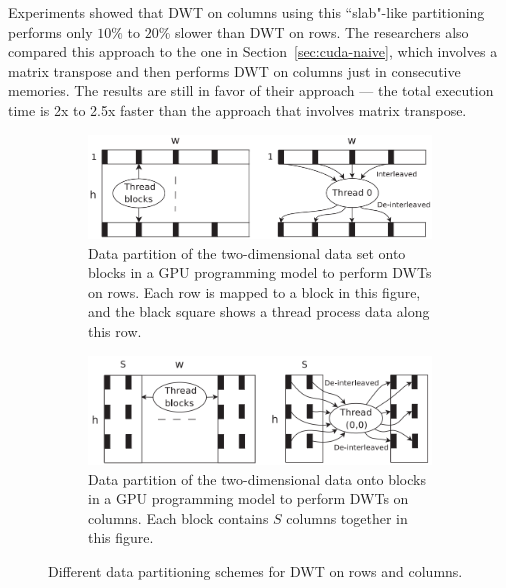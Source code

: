 Experiments showed that DWT on columns using this ``slab"-like 
partitioning performs only $10\%$ to $20\%$ slower than DWT on rows.
%
The researchers also compared this approach to the one in 
Section~\ref{sec:cuda-naive}, which involves a matrix transpose
and then performs DWT on columns just in consecutive memories.
%
The results are still in favor of their approach --- the total
execution time is 2x to 2.5x faster than the approach that involves
matrix transpose.

\begin{figure}
    \centering
    \begin{subfigure}[b]{0.85\textwidth}
                \includegraphics[width=\textwidth]{fig/row.png}
                \caption{
                Data partition of the two-dimensional data set onto 
                blocks in a GPU programming model to perform DWTs on rows.
                Each row is mapped to a block in this figure, and the black
                square shows a thread process data along this row. 
                }
                \label{fig:cuda-row}
        \end{subfigure}
\quad
    \begin{subfigure}[b]{0.85\textwidth}
        \includegraphics[width=\textwidth]{fig/column.png}
        \caption{
                Data partition of the two-dimensional data onto 
                blocks in a GPU programming model to perform DWTs on columns.
                Each block contains $S$ columns together in this figure.
                }
        \label{fig:cuda-column}
    \end{subfigure}
%
    \caption{Different data partitioning schemes for DWT on rows and columns.}
\end{figure}


